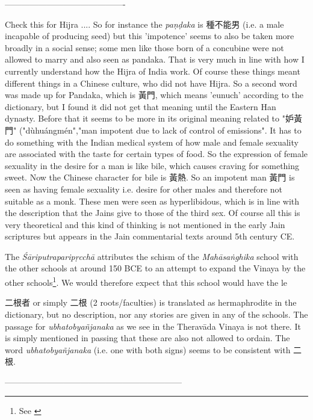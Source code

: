 -------------------------------------------


Check this for Hijra .... 
So for instance the {\em paṇḍaka} is 種不能男 (i.e. a male incapable of producing seed) but this 'impotence' seems to also be taken more broadly in a social sense; some men like those born of a concubine were not allowed to marry and also seen as pandaka. That is very much in line with how I currently understand how the Hijra of India work. Of course these things meant different things in a Chinese culture, who did not have Hijra. So a second word was made up for Pandaka, which is 黃門, which means 'eunuch' according to the dictionary, but I found it did not get that meaning until the Eastern Han dynasty. Before that it seems to be more in its original meaning related to "妒黃門" ("dùhuángmén","man impotent due to lack of control of emissions". It has to do something with the Indian medical system of how male and female sexuality are associated with the taste for certain types of food. So the expression of female sexuality in the desire for a man is like bile, which causes craving for something sweet. Now the Chinese character for bile is 黃熱. So an impotent man 黃門 is seen as having female sexuality i.e. desire for other males and therefore not suitable as a monk. These men were seen as hyperlibidous, which is in line with the description that the Jains give to those of the third sex. Of course all this is very theoretical and this kind of thinking is not mentioned in the early Jain scriptures but appears in the Jain commentarial texts around 5th century CE. 


The {\em Śāriputraparipṛcchā} attributes the schism of the {\em Mahāsaṅghika} school with the other schools at around 150 BCE to an attempt to expand the Vinaya by the other schools\footnote{See \cite{sujato2012}}. We would therefore expect that this school would have the le



二根者 or simply 二根 (2 roots/faculties) is translated as hermaphrodite in the dictionary, but no description, nor any stories are given in any of the schools. The passage for {\em ubhatob­yañ­janaka} as we see in the Theravāda Vinaya is not there. It is simply mentioned in passing that these are also not allowed to ordain. The word {\em ubhatob­yañ­janaka} (i.e. one with both signs) seems to be consistent with 二根.



---------------------------------------------------------------


